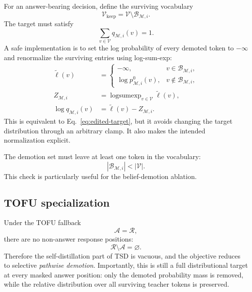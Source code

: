 \documentclass{article}
\newcommand{\V}{\mathcal{V}}
\newcommand{\Mset}{\mathcal{M}}
\newcommand{\Aset}{\mathcal{A}}
\begin{document}
For an answer-bearing decision, define the surviving vocabulary
\begin{equation}
    \V_{\mathrm{keep}}
    =
    \V\setminus\mathcal{B}_{\Mset,i}.
\end{equation}
The target must satisfy
\begin{equation}
    \sum_{v\in\V}q_{\Mset,i}(v)=1.
\end{equation}
A safe implementation is to set the log probability of every demoted token to
$-\infty$ and renormalize the surviving entries using log-sum-exp:
\begin{align}
    \tilde{\ell}(v)
    &=
    \begin{cases}
        -\infty, & v\in\mathcal{B}_{\Mset,i},\\
        \log p^0_{\Mset,i}(v), & v\notin\mathcal{B}_{\Mset,i},
    \end{cases}\\
    Z_{\Mset,i}
    &=\operatorname{logsumexp}_{v\in\V}\tilde{\ell}(v),\\
    \log q_{\Mset,i}(v)
    &=\tilde{\ell}(v)-Z_{\Mset,i}.
\end{align}
This is equivalent to Eq.~\eqref{eq:edited-target}, but it avoids changing the
target distribution through an arbitrary clamp.  It also makes the intended
normalization explicit.

The demotion set must leave at least one token in the vocabulary:
\begin{equation}
    |\mathcal{B}_{\Mset,i}| < |\V|.
\end{equation}
This check is particularly useful for the belief-demotion ablation.

\subsection{TOFU specialization}

Under the TOFU fallback
\begin{equation}
    \Aset=\mathcal{R},
\end{equation}
there are no non-answer response positions:
\begin{equation}
    \mathcal{R}\setminus\Aset=\varnothing.
\end{equation}
Therefore the self-distillation part of TSD is vacuous, and the objective
reduces to selective \emph{pathwise demotion}.  Importantly, this is still a
full distributional target at every masked answer position: only the demoted
probability mass is removed, while the relative distribution over all surviving
teacher tokens is preserved.
\end{document}
